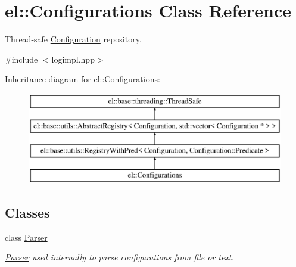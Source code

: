 \hypertarget{classel_1_1Configurations}{\section{el\-:\-:Configurations Class Reference}
\label{classel_1_1Configurations}
}


Thread-\/safe \hyperlink{classel_1_1Configuration}{Configuration} repository.  




{\ttfamily \#include $<$logimpl.\-hpp$>$}

Inheritance diagram for el\-:\-:Configurations\-:\begin{figure}[H]
\begin{center}
\leavevmode
\includegraphics[height=4.000000cm]{classel_1_1Configurations}
\end{center}
\end{figure}
\subsection*{Classes}
\begin{DoxyCompactItemize}
\item 
class \hyperlink{classel_1_1Configurations_1_1Parser}{Parser}
\begin{DoxyCompactList}\small\item\em \hyperlink{classel_1_1Configurations_1_1Parser}{Parser} used internally to parse configurations from file or text. \end{DoxyCompactList}\end{DoxyCompactItemize}
